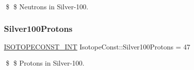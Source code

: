 \$ \$ Neutrons in Silver-\/100. \mbox{\label{group___isotope_const-_silver-_ag100_gaad95ca021a6fc4158e4ee3c86b72bc4c}} 
\subsubsection{\texorpdfstring{Silver100\+Protons}{Silver100Protons}}
{\footnotesize\ttfamily \mbox{\hyperlink{group___isotope_const-_macros_ga5f18360b3e99483a35c32d789e62621c}{I\+S\+O\+T\+O\+P\+E\+C\+O\+N\+S\+T\+\_\+\+I\+NT}} Isotope\+Const\+::\+Silver100\+Protons = 47}

\$ \$ Protons in Silver-\/100. 